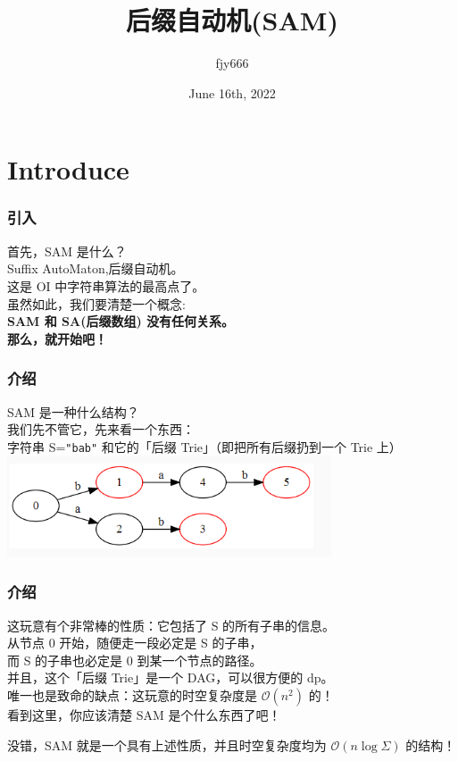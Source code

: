 \documentclass{beamer}
\title{后缀自动机(SAM)}
\author{fjy666}
\date{June 16th, 2022}
\begin{document}
    \frame{\titlepage}

    \section{Introduce}
    \begin{frame}
        \frametitle{引入}
        首先，SAM 是什么？ \\
        Suffix AutoMaton,后缀自动机。\\
        这是 OI 中字符串算法的最高点了。\\
        虽然如此，我们要清楚一个概念:\\
        \bf SAM 和 SA(后缀数组) 没有任何关系。\\  
        \textnormal{那么，就开始吧！}
    \end{frame}

    \begin{frame}
        \frametitle{介绍}
        SAM 是一种什么结构？\\  
        我们先不管它，先来看一个东西：\\
        字符串 S=\texttt{"bab"} 和它的「后缀 Trie」（即把所有后缀扔到一个 Trie 上）
        \includegraphics[height=3cm]{g1.png}
    \end{frame}

    \begin{frame}
        \frametitle{介绍}
        这玩意有个非常棒的性质：它包括了 S 的所有子串的信息。\\
        从节点 $0$ 开始，随便走一段必定是 S 的子串，\\
        而 S 的子串也必定是 $0$ 到某一个节点的路径。\\
        并且，这个「后缀 Trie」是一个 DAG，可以很方便的 dp。\\
        \pause
        唯一也是致命的缺点：这玩意的时空复杂度是 $\mathcal{O}(n^2)$ 的！\\
        看到这里，你应该清楚 SAM 是个什么东西了吧！
    \end{frame}

    \begin{frame}
        没错，SAM 就是一个具有上述性质，并且时空复杂度均为 $\mathcal{O}(n\log\Sigma)$ 的结构！
    \end{frame}
\end{document}
